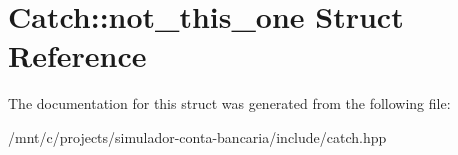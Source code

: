 \hypertarget{structCatch_1_1not__this__one}{}\section{Catch\+:\+:not\+\_\+this\+\_\+one Struct Reference}
\label{structCatch_1_1not__this__one}


The documentation for this struct was generated from the following file\+:\begin{DoxyCompactItemize}
\item 
/mnt/c/projects/simulador-\/conta-\/bancaria/include/catch.\+hpp\end{DoxyCompactItemize}
